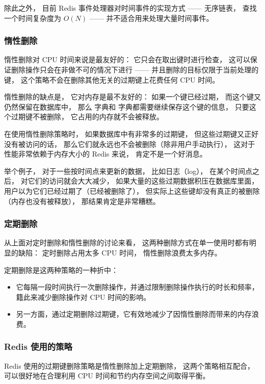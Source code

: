 \documentclass[a4paper,11pt,english]{sphinxmanual}
\begin{document}
除此之外，
目前 Redis 事件处理器对时间事件的实现方式 —— 无序链表，
查找一个时间复杂度为 $O(N)$  —— 并不适合用来处理大量时间事件。


\subsubsection{惰性删除}
\label{internal/db:id17}
惰性删除对 CPU 时间来说是最友好的：
它只会在取出键时进行检查，
这可以保证删除操作只会在非做不可的情况下进行 ——
并且删除的目标仅限于当前处理的键，
这个策略不会在删除其他无关的过期键上花费任何 CPU 时间。

惰性删除的缺点是，
它对内存是最不友好的：
如果一个键已经过期，
而这个键又仍然保留在数据库中，
那么  字典和  字典都需要继续保存这个键的信息，
只要这个过期键不被删除，
它占用的内存就不会被释放。

在使用惰性删除策略时，
如果数据库中有非常多的过期键，
但这些过期键又正好没有被访问的话，
那么它们就永远也不会被删除（除非用户手动执行），
这对于性能非常依赖于内存大小的 Redis 来说，
肯定不是一个好消息。

举个例子，
对于一些按时间点来更新的数据，
比如日志（log），
在某个时间点之后，
对它们的访问就会大大减少，
如果大量的这些过期数据积压在数据库里面，
用户以为它们已经过期了（已经被删除了），
但实际上这些键却没有真正的被删除（内存也没有被释放），
那结果肯定是非常糟糕。


\subsubsection{定期删除}
\label{internal/db:id18}
从上面对定时删除和惰性删除的讨论来看，
这两种删除方式在单一使用时都有明显的缺陷：
定时删除占用太多 CPU 时间，
惰性删除浪费太多内存。

定期删除是这两种策略的一种折中：
\begin{itemize}
\item {} 
它每隔一段时间执行一次删除操作，并通过限制删除操作执行的时长和频率，籍此来减少删除操作对 CPU 时间的影响。

\item {} 
另一方面，通过定期删除过期键，它有效地减少了因惰性删除而带来的内存浪费。

\end{itemize}


\subsubsection{Redis 使用的策略}
\label{internal/db:redis}
Redis 使用的过期键删除策略是惰性删除加上定期删除，
这两个策略相互配合，可以很好地在合理利用 CPU 时间和节约内存空间之间取得平衡。
\end{document}
